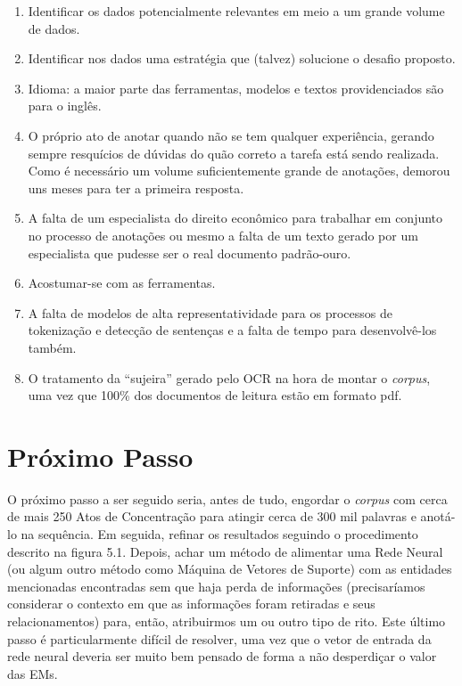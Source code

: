 \documentclass[11pt]{report}
\newcommand{\quotes}[1]{``#1''}
\begin{document}
\begin{enumerate}[label={\textbf{\Roman*.}}]
  \item Identificar os dados potencialmente relevantes em meio a um grande volume de dados.
  \item Identificar nos dados uma estratégia que (talvez) solucione o desafio proposto.
  \item Idioma: a maior parte das ferramentas, modelos e textos providenciados são para o inglês.
  \item O próprio ato de anotar quando não se tem qualquer experiência, gerando sempre resquícios de dúvidas do quão correto a tarefa está sendo realizada. Como é necessário
um volume suficientemente grande de anotações, demorou uns meses para ter a primeira resposta.
  \item A falta de um especialista do direito econômico para trabalhar em conjunto no processo de anotações ou mesmo a falta de um texto gerado por um especialista que pudesse ser
o real documento padrão-ouro.
  \item Acostumar-se com as ferramentas.
  \item A falta de modelos de alta representatividade para os processos de tokenização e detecção de sentenças e a falta de tempo para desenvolvê-los também.
  \item O tratamento da \quotes{sujeira} gerado pelo OCR na hora de montar o \textit{corpus}, uma vez que 100\% dos documentos de leitura estão em formato pdf.
\end{enumerate}

\section{Próximo Passo}

\indent\indent O próximo passo a ser seguido seria, antes de tudo, engordar o \textit{corpus} com cerca de mais 250 Atos de Concentração para atingir cerca de 300 mil palavras e anotá-lo
na sequência. Em seguida, refinar os resultados seguindo o procedimento descrito na figura 5.1. Depois, achar um método de alimentar uma Rede Neural (ou algum outro método como Máquina de
Vetores de Suporte) com as entidades mencionadas encontradas sem que haja perda de informações (precisaríamos considerar o contexto em que as informações foram retiradas e seus relacionamentos) para, então, atribuirmos um ou outro tipo de rito. Este último passo é particularmente difícil de resolver, uma vez que o vetor de entrada da rede neural deveria ser
muito bem pensado de forma a não desperdiçar o valor das EMs.
\end{document}
